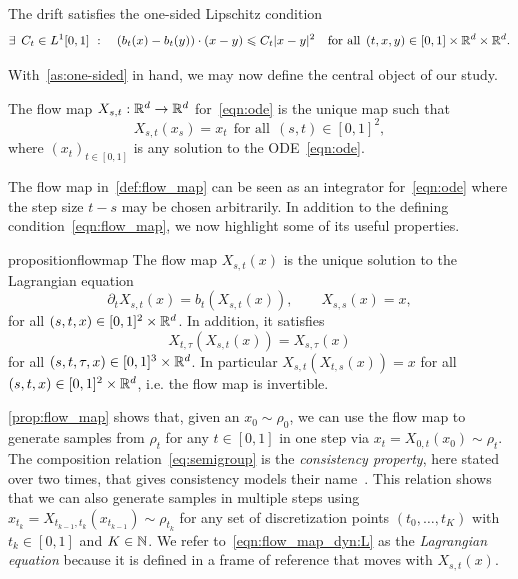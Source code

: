 \begin{assumption}
	\label{as:one-sided}
	The drift satisfies the one-sided Lipschitz condition
	\begin{equation}
		\label{eq:one:sided:lip}
		\exists \:\: C_t \in L^1[0,1] \ : \quad (b_t(x)-b_t(y))\cdot (x-y) \leqslant C_t |x-y|^2 \quad \text{for all} \:\: (t,x,y) \in [0,1]\times \mathbb{R}^d \times \mathbb{R}^d.
	\end{equation}
\end{assumption}
%
With~\cref{as:one-sided} in hand, we may now define the central object of our study.
%
\begin{definition}
	\label{def:flow_map}
	The flow map $X_{s, t}:\mathbb{R}^d\rightarrow\mathbb{R}^d$ for~\eqref{eqn:ode} is the unique map such that
	\begin{equation}
		\label{eqn:flow_map}
		X_{s, t}(x_s) = x_t \:\: \text{for all} \:\: (s,t) \in [0,1]^2,
	\end{equation}
	where $(x_t)_{t\in[0,1]}$ is any solution to the ODE~\eqref{eqn:ode}.
\end{definition}
The flow map in~\cref{def:flow_map} can be seen as an integrator for~\eqref{eqn:ode} where the step size $t-s$ may be chosen arbitrarily.
%
In addition to the defining condition~\eqref{eqn:flow_map}, we now highlight some of its useful properties.
%
\begin{restatable}{proposition}{flowmap}
	\label{prop:flow_map}
	The flow map $X_{s, t}(x)$ is the unique solution to the Lagrangian equation
	\begin{equation}
		\label{eqn:flow_map_dyn:L}
		\partial_t X_{s, t}(x) = b_t(X_{s, t}(x)), \qquad X_{s,s}(x) = x,
	\end{equation}
	for all $(s,t,x) \in [0,1]^2\times \mathbb{R}^d$. In addition, it satisfies
	\begin{equation}
		\label{eq:semigroup}
		X_{t,\tau}(X_{s,t}(x)) = X_{s,\tau}(x)
	\end{equation}
	for all $(s,t,\tau,x) \in [0,1]^3\times \mathbb{R}^d$.
	In particular $X_{s,t} (X_{t,s}(x)) = x$ for all $(s,t,x) \in [0,1]^2\times \mathbb{R}^d$, i.e. the flow map is invertible.
\end{restatable}
%
\cref{prop:flow_map} shows that, given an $x_0\sim\rho_0$, we can use the flow map to generate samples from $\rho_t$ for any $t\in[0,1]$ in one step via $x_t=X_{0,t}(x_0)\sim \rho_t$.
%
The composition relation~\eqref{eq:semigroup} is the \emph{consistency property}, here stated over two times, that gives consistency models their name~\citep{song_consistency_2023}.
%
This relation shows that we can also generate samples in multiple steps using $x_{t_k} = X_{t_{k-1},t_k}(x_{t_{k-1}})\sim\rho_{t_k}$ for any set of discretization points $(t_0,\ldots, t_K)$ with $t_k \in [0,1]$ and $K \in \mathbb{N}$.
%
We refer to~\eqref{eqn:flow_map_dyn:L} as the \emph{Lagrangian equation} because it is defined in a frame of reference that moves with  $X_{s, t}(x)$.

